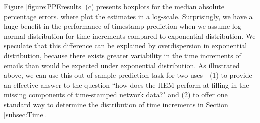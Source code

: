 \documentclass[ba]{imsart}
\numberwithin{equation}{section}
\theoremstyle{plain}
\begin{document}
	Figure \ref{figure:PPEresults} (c) presents boxplots for the median absolute percentage errors. where plot the estimates in a log-scale. Surprisingly, we have a huge benefit in the performance of timestamp prediction when we assume log-normal distribution for time increments compared to exponential distribution. We speculate that this difference can be explained by overdispersion in exponential distribution, because there exists greater variability in the time increments of emails than would be expected under exponential distribution. As illustrated above, we can use this out-of-sample prediction task for two uses---(1) to provide an effective answer to the question ``how does the HEM perform at filling in the missing components of time-stamped network data?" and (2) to offer one standard way to determine the distribution of time increments in Section \ref{subsec:Time}. 
	
\end{document}
